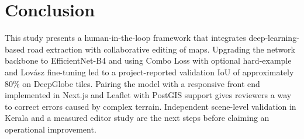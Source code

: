 \documentclass[10pt,a4paper,twocolumn]{article}
\begin{document}
\section{Conclusion}
This study presents a human-in-the-loop framework that integrates deep-learning-based road extraction with collaborative editing of maps. Upgrading the network backbone to EfficientNet-B4 and using Combo Loss with optional hard-example and Lov\'{a}sz fine-tuning led to a project-reported validation IoU of approximately 80\% on DeepGlobe tiles. Pairing the model with a responsive front end implemented in Next.js and Leaflet with PostGIS support gives reviewers a way to correct errors caused by complex terrain. Independent scene-level validation in Kerala and a measured editor study are the next steps before claiming an operational improvement. 
\end{document}
